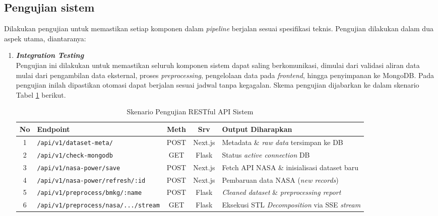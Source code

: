 \subsection{Pengujian sistem}
Dilakukan pengujian untuk memastikan setiap komponen dalam \textit{pipeline} berjalan sesuai spesifikasi teknis. Pengujian dilakukan dalam dua aspek utama, diantaranya:

\begin{enumerate}
    \item \textbf{\textit{Integration Testing}} \\
    Pengujian ini dilakukan untuk memastikan seluruh komponen sistem dapat saling berkomunikasi, dimulai dari validasi aliran data mulai dari pengambilan data eksternal, proses \textit{preprocessing}, pengelolaan data pada \textit{frontend}, hingga penyimpanan ke MongoDB. Pada pengujian inilah dipastikan otomasi dapat berjalan sesuai jadwal tanpa kegagalan. Skema pengujian dijabarkan ke dalam skenario Tabel \ref{tab:integration_scenario} berikut.
        \begin{table}[H]
        \centering
        \caption{Skenario Pengujian RESTful API Sistem}
        \label{tab:integration_scenario}
        \scriptsize %
        \setlength{\tabcolsep}{2pt} %
        \renewcommand{\arraystretch}{1.1} %
        \begin{tabular}{|c|l|c|c|p{4.2cm}|}
        \hline
        \textbf{No} & \textbf{Endpoint} & \textbf{Meth} & \textbf{Srv} & \textbf{Output Diharapkan} \\ \hline
        1 & \texttt{/api/v1/dataset-meta/} & POST & Next.js & Metadata \& \textit{raw data} tersimpan ke DB \\ \hline
        2 & \texttt{/api/v1/check-mongodb} & GET & Flask & Status \textit{active connection} DB \\ \hline
        3 & \texttt{/api/v1/nasa-power/save} & POST & Next.js & Fetch API NASA \& inisialisasi dataset baru \\ \hline
        4 & \texttt{/api/v1/nasa-power/refresh/:id} & POST & Next.js & Pembaruan data NASA (\textit{new records}) \\ \hline
        5 & \texttt{/api/v1/preprocess/bmkg/:name} & POST & Flask & \textit{Cleaned dataset} \& \textit{preprocessing report} \\ \hline
        6 & \texttt{/api/v1/preprocess/nasa/.../stream} & GET & Flask & Eksekusi STL \textit{Decomposition} via SSE \textit{stream} \\ \hline

\end{tabular}
\end{table}
\end{enumerate}
